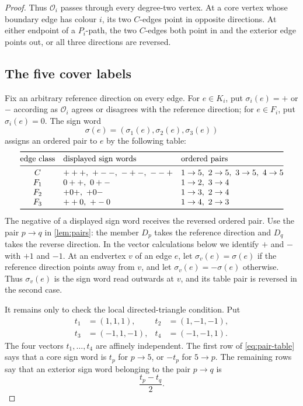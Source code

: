 \documentclass[justified,notoc,twoside,nobib,nofonts]{tufte-handout}
\begin{document}
\begin{proof}
Thus \(\mathcal O_i\) passes through every degree-two vertex.  At a core
vertex whose boundary edge has colour \(i\), its two \(C\)-edges point in
opposite directions.  At either endpoint of a \(P_i\)-path, the two
\(C\)-edges both point in and the exterior edge points out, or all three
directions are reversed.

\subsection*{The five cover labels}

Fix an arbitrary reference direction on every edge.  For
\(e\in K_i\), put \(\sigma_i(e)=+\) or \(-\) according as
\(\mathcal O_i\) agrees or disagrees with the reference direction; for
\(e\in F_i\), put \(\sigma_i(e)=0\).  The sign word
\[
 \sigma(e)=(\sigma_1(e),\sigma_2(e),\sigma_3(e))
\]
assigns an ordered pair to \(e\) by the following table:
\begingroup
\small
\begin{equation}\label{eq:pair-table}
\begin{array}{@{}c@{\quad}l@{\quad}l@{}}
\toprule
\text{edge class}&\text{displayed sign words}&\text{ordered pairs}\\
\midrule
C   & +++,\ +--,\ -+-,\ --+&
       1\to5,\ 2\to5,\ 3\to5,\ 4\to5\\
F_1 & 0++,\ 0+-&1\to2,\ 3\to4\\
F_2 & +0+,\ +0-&1\to3,\ 2\to4\\
F_3 & ++0,\ +-0&1\to4,\ 2\to3\\
\bottomrule
\end{array}
\end{equation}
\endgroup
The negative of a displayed sign word receives the reversed ordered pair.
Use the pair \(p\to q\) in \cref{lem:pairs}: the member \(D_p\) takes the
reference direction and \(D_q\) takes the reverse direction.
In the vector calculations below we identify \(+\) and \(-\) with \(+1\)
and \(-1\).  At an endvertex \(v\) of an edge \(e\), let
\(\sigma_v(e)=\sigma(e)\) if the reference direction points away from \(v\),
and let \(\sigma_v(e)=-\sigma(e)\) otherwise.  Thus \(\sigma_v(e)\) is the
sign word read outwards at \(v\), and its table pair is reversed in the
second case.

It remains only to check the local directed-triangle condition.  Put
\[
\begin{aligned}
 t_1&=(1,1,1),&t_2&=(1,-1,-1),\\
 t_3&=(-1,1,-1),&t_4&=(-1,-1,1).
\end{aligned}
\]
The four vectors \(t_1,\ldots,t_4\) are affinely independent.  The first
row of \eqref{eq:pair-table} says that a core sign word is \(t_p\) for
\(p\to5\), or \(-t_p\) for \(5\to p\).  The remaining rows say that an
exterior sign word belonging to the pair \(p\to q\) is
\[
 \frac{t_p-t_q}{2}.
\]


\end{proof}
\end{document}
